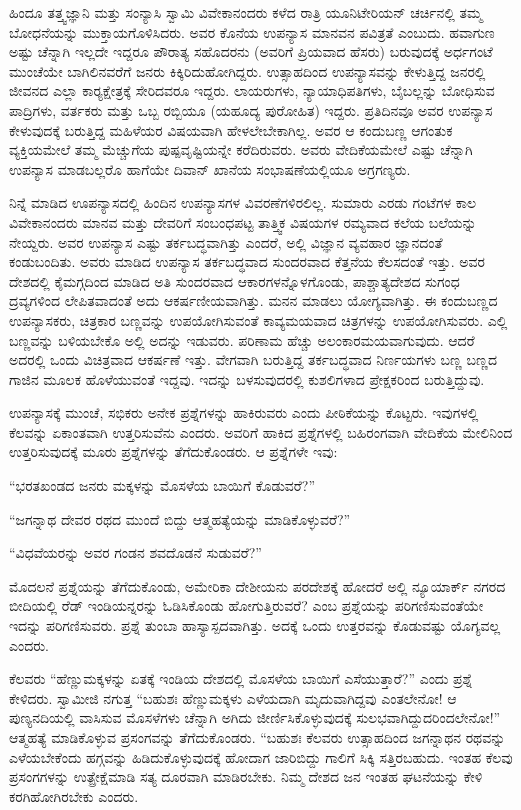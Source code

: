  ಹಿಂದೂ ತತ್ತ್ವಜ್ಞಾನಿ ಮತ್ತು ಸಂನ್ಯಾಸಿ ಸ್ವಾಮಿ ವಿವೇಕಾನಂದರು ಕಳೆದ ರಾತ್ರಿ ಯೂನಿಟೇರಿಯನ್ ಚರ್ಚಿನಲ್ಲಿ ತಮ್ಮ ಬೋಧನೆಯನ್ನು ಮುಕ್ತಾಯಗೊಳಿಸಿದರು. ಅವರ ಕೊನೆಯ ಉಪನ್ಯಾಸ ಮಾನವನ ಪವಿತ್ರತೆ ಎಂಬುದು. ಹವಾಗುಣ ಅಷ್ಟು ಚೆನ್ನಾಗಿ ಇಲ್ಲದೇ ಇದ್ದರೂ ಪೌರಾತ್ಯ ಸಹೊದರನು (ಅವರಿಗೆ ಪ್ರಿಯವಾದ ಹೆಸರು) ಬರುವುದಕ್ಕೆ ಅರ್ಧಗಂಟೆ ಮುಂಚೆಯೇ ಬಾಗಿಲಿನವರೆಗೆ ಜನರು ಕಿಕ್ಕಿರಿದುಹೋಗಿದ್ದರು. ಉತ್ಸಾಹದಿಂದ ಉಪನ್ಯಾಸವನ್ನು ಕೇಳುತ್ತಿದ್ದ ಜನರಲ್ಲಿ ಜೀವನದ ಎಲ್ಲಾ ಕಾರ‍್ಯಕ್ಷೇತ್ರಕ್ಕೆ ಸೇರಿದವರೂ ಇದ್ದರು. ಲಾಯರುಗಳು, ನ್ಯಾಯಾಧಿಪತಿಗಳು, ಬೈಬಲ್ಲನ್ನು ಬೋಧಿಸುವ ಪಾದ್ರಿಗಳು, ವರ್ತಕರು ಮತ್ತು ಒಬ್ಬ ರಬ್ಬಿಯೂ (ಯಹೂದ್ಯ ಪುರೋಹಿತ) ಇದ್ದರು. ಪ್ರತಿದಿನವೂ ಅವರ ಉಪನ್ಯಾಸ ಕೇಳುವುದಕ್ಕೆ ಬರುತ್ತಿದ್ದ ಮಹಿಳೆಯರ ವಿಷಯವಾಗಿ ಹೇಳಲೇಬೇಕಾಗಿಲ್ಲ. ಅವರ ಆ ಕಂದುಬಣ್ಣ ಆಗಂತುಕ ವ್ಯಕ್ತಿಯಮೇಲೆ ತಮ್ಮ ಮೆಚ್ಚುಗೆಯ ಪುಷ್ಪವೃಷ್ಟಿಯನ್ನೇ ಕರೆದಿರುವರು. ಅವರು ವೇದಿಕೆಯಮೇಲೆ ಎಷ್ಟು ಚೆನ್ನಾಗಿ ಉಪನ್ಯಾಸ ಮಾಡಬಲ್ಲರೊ ಹಾಗೆಯೇ ದಿವಾನ್ ಖಾನೆಯ ಸಂಭಾಷಣೆಯಲ್ಲಿಯೂ ಅಗ್ರಗಣ್ಯರು. 

 ನಿನ್ನೆ ಮಾಡಿದ ಊಪನ್ಯಾಸದಲ್ಲಿ ಹಿಂದಿನ ಉಪನ್ಯಾಸಗಳ ವಿವರಣೆಗಳಿರಲಿಲ್ಲ. ಸುಮಾರು ಎರಡು ಗಂಟೆಗಳ ಕಾಲ ವಿವೇಕಾನಂದರು ಮಾನವ ಮತ್ತು ದೇವರಿಗೆ ಸಂಬಂಧಪಟ್ಟ ತಾತ್ತ್ವಿಕ ವಿಷಯಗಳ ರಮ್ಯವಾದ ಕಲೆಯ ಬಲೆಯನ್ನು ನೇಯ್ದರು. ಅವರ ಉಪನ್ಯಾಸ ಎಷ್ಟು ತರ್ಕಬದ್ಧವಾಗಿತ್ತು ಎಂದರೆ, ಅಲ್ಲಿ ವಿಜ್ಞಾನ ವ್ಯವಹಾರ ಜ್ಞಾನದಂತೆ ಕಂಡುಬಂದಿತು. ಅವರು ಮಾಡಿದ ಉಪನ್ಯಾಸ ತರ್ಕಬದ್ಧವಾದ ಸುಂದರವಾದ ಕೆತ್ತನೆಯ ಕೆಲಸದಂತೆ ಇತ್ತು. ಅವರ ದೇಶದಲ್ಲಿ ಕೈಮಗ್ಗದಿಂದ ಮಾಡಿದ ಅತಿ ಸುಂದರವಾದ ಆಕಾರಗಳನ್ನೊಳಗೊಂಡು, ಪಾಶ್ಚಾತ್ಯದೇಶದ ಸುಗಂಧ ದ್ರವ್ಯಗಳಿಂದ ಲೇಪಿತವಾದಂತೆ ಅದು ಆಕರ್ಷಣೀಯವಾಗಿತ್ತು. ಮನನ ಮಾಡಲು ಯೋಗ್ಯವಾಗಿತ್ತು. ಈ ಕಂದುಬಣ್ಣದ ಉಪನ್ಯಾಸಕರು, ಚಿತ್ರಕಾರ ಬಣ್ಣವನ್ನು ಉಪಯೋಗಿಸುವಂತೆ ಕಾವ್ಯಮಯವಾದ ಚಿತ್ರಗಳನ್ನು ಉಪಯೋಗಿಸುವರು. ಎಲ್ಲಿ ಬಣ್ಣವನ್ನು ಬಳಿಯಬೇಕೊ ಅಲ್ಲಿ ಅದನ್ನು ಇಡುವರು. ಪರಿಣಾಮ ಹೆಚ್ಚು ಅಲಂಕಾರಮಯವಾಗುವುದು. ಆದರೆ ಅದರಲ್ಲಿ ಒಂದು ವಿಚಿತ್ರವಾದ ಆಕರ್ಷಣೆ ಇತ್ತು. ವೇಗವಾಗಿ ಬರುತ್ತಿದ್ದ ತರ್ಕಬದ್ಧವಾದ ನಿರ್ಣಯಗಳು ಬಣ್ಣ ಬಣ್ಣದ ಗಾಜಿನ ಮೂಲಕ ಹೊಳೆಯುವಂತೆ ಇದ್ದವು. ಇದನ್ನು ಬಳಸುವುದರಲ್ಲಿ ಕುಶಲಿಗಳಾದ ಪ್ರೇಕ್ಷಕರಿಂದ ಬರುತ್ತಿದ್ದುವು. 

 ಉಪನ್ಯಾಸಕ್ಕೆ ಮುಂಚೆ, ಸಭಿಕರು ಅನೇಕ ಪ್ರಶ್ನೆಗಳನ್ನು ಹಾಕಿರುವರು ಎಂದು ಪೀಠಿಕೆಯನ್ನು ಕೊಟ್ಟರು. ಇವುಗಳಲ್ಲಿ ಕೆಲವನ್ನು ಏಕಾಂತವಾಗಿ ಉತ್ತರಿಸುವೆನು ಎಂದರು. ಅವರಿಗೆ ಹಾಕಿದ ಪ್ರಶ್ನೆಗಳಲ್ಲಿ ಬಹಿರಂಗವಾಗಿ ವೇದಿಕೆಯ ಮೇಲಿನಿಂದ ಉತ್ತರಿಸುವುದಕ್ಕೆ ಮೂರು ಪ್ರಶ್ನೆಗಳನ್ನು ತೆಗೆದುಕೊಂಡರು. ಆ ಪ್ರಶ್ನೆಗಳೇ ಇವು: 

 “ಭರತಖಂಡದ ಜನರು ಮಕ್ಕಳನ್ನು ಮೊಸಳೆಯ ಬಾಯಿಗೆ ಕೊಡುವರೆ?” 

 “ಜಗನ್ನಾಥ ದೇವರ ರಥದ ಮುಂದೆ ಬಿದ್ದು ಆತ್ಮಹತ್ಯೆಯನ್ನು ಮಾಡಿಕೊಳ್ಳುವರೆ?” 

 “ವಿಧವೆಯರನ್ನು ಅವರ ಗಂಡನ ಶವದೊಡನೆ ಸುಡುವರೆ?” 

 ಮೊದಲನೆ ಪ್ರಶ್ನೆಯನ್ನು ತೆಗೆದುಕೊಂಡು, ಅಮೇರಿಕಾ ದೇಶೀಯನು ಪರದೇಶಕ್ಕೆ ಹೋದರೆ ಅಲ್ಲಿ ನ್ಯೂಯಾರ್ಕ್ ನಗರದ ಬೀದಿಯಲ್ಲಿ ರೆಡ್ ಇಂಡಿಯನ್ನರನ್ನು ಓಡಿಸಿಕೊಂಡು ಹೋಗುತ್ತಿರುವರೆ? ಎಂಬ ಪ್ರಶ್ನೆಯನ್ನು ಪರಿಗಣಿಸುವಂತೆಯೇ ಇದನ್ನು ಪರಿಗಣಿಸುವರು. ಪ್ರಶ್ನೆ ತುಂಬಾ ಹಾಸ್ಯಾಸ್ಪದವಾಗಿತ್ತು. ಅದಕ್ಕೆ ಒಂದು ಉತ್ತರವನ್ನು ಕೊಡುವಷ್ಟು ಯೊಗ್ಯವಲ್ಲ ಎಂದರು. 

 ಕೆಲವರು “ಹೆಣ್ಣುಮಕ್ಕಳನ್ನು ಏತಕ್ಕೆ ಇಂಡಿಯ ದೇಶದಲ್ಲಿ ಮೊಸಳೆಯ ಬಾಯಿಗೆ ಎಸೆಯುತ್ತಾರೆ?” ಎಂದು ಪ್ರಶ್ನೆ ಕೇಳಿದರು. ಸ್ವಾಮೀಜಿ ನಗುತ್ತ “ಬಹುಶಃ ಹೆಣ್ಣುಮಕ್ಕಳು ಎಳೆಯದಾಗಿ ಮೃದುವಾಗಿದ್ದವು ಎಂತಲೇನೋ! ಆ ಪುಣ್ಯನದಿಯಲ್ಲಿ ವಾಸಿಸುವ ಮೊಸಳೆಗಳು ಚೆನ್ನಾಗಿ ಅಗಿದು ಜೀರ್ಣಿಸಿಕೊಳ್ಳುವುದಕ್ಕೆ ಸುಲಭವಾಗಿದ್ದುದರಿಂದಲೇನೋ!” ಆತ್ಮಹತ್ಯೆ ಮಾಡಿಕೊಳ್ಳುವ ಪ್ರಸಂಗವನ್ನು ತೆಗೆದುಕೊಂಡರು. “ಬಹುಶಃ ಕೆಲವರು ಉತ್ಸಾಹದಿಂದ ಜಗನ್ನಾಥನ ರಥವನ್ನು ಎಳೆಯಬೇಕೆಂದು ಹಗ್ಗವನ್ನು ಹಿಡಿದುಕೊಳ್ಳುವುದಕ್ಕೆ ಹೋದಾಗ ಜಾರಿಬಿದ್ದು ಗಾಲಿಗೆ ಸಿಕ್ಕಿ ಸತ್ತಿರಬಹುದು. ಇಂತಹ ಕೆಲವು ಪ್ರಸಂಗಗಳನ್ನು ಉತ್ಪ್ರೇಕ್ಷೆಮಾಡಿ ಸತ್ಯ ದೂರವಾಗಿ ಮಾಡಿರಬೇಕು. ನಿಮ್ಮ ದೇಶದ ಜನ ಇಂತಹ ಘಟನೆಯನ್ನು ಕೇಳಿ ಕರಗಿಹೋಗಿರಬೇಕು ಎಂದರು. 

